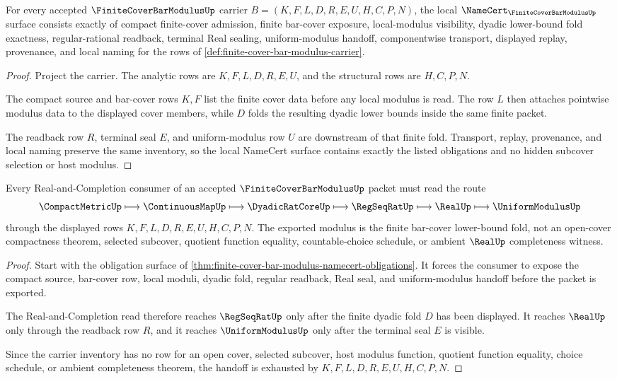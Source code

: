 \begin{theorem}
\label{thm:finite-cover-bar-modulus-namecert-obligations}
For every accepted $\FiniteCoverBarModulusUp$ carrier $B=(K,F,L,D,R,E,U,H,C,P,N)$, the local $\NameCert_{\FiniteCoverBarModulusUp}$ surface consists exactly of compact finite-cover admission, finite bar-cover exposure, local-modulus visibility, dyadic lower-bound fold exactness, regular-rational readback, terminal Real sealing, uniform-modulus handoff, componentwise transport, displayed replay, provenance, and local naming for the rows of \autoref{def:finite-cover-bar-modulus-carrier}.
\end{theorem}
\begin{proof}
Project the carrier. The analytic rows are $K,F,L,D,R,E,U$, and the structural rows are $H,C,P,N$.

The compact source and bar-cover rows $K,F$ list the finite cover data before any local modulus is read. The row $L$ then attaches pointwise modulus data to the displayed cover members, while $D$ folds the resulting dyadic lower bounds inside the same finite packet.

The readback row $R$, terminal seal $E$, and uniform-modulus row $U$ are downstream of that finite fold. Transport, replay, provenance, and local naming preserve the same inventory, so the local NameCert surface contains exactly the listed obligations and no hidden subcover selection or host modulus.
\end{proof}

\begin{theorem}
\label{thm:finite-cover-bar-modulus-real-completion-handoff}
Every Real-and-Completion consumer of an accepted $\FiniteCoverBarModulusUp$ packet must read the route
$$
\CompactMetricUp \longmapsto \ContinuousMapUp \longmapsto \DyadicRatCoreUp \longmapsto \RegSeqRatUp \longmapsto \RealUp \longmapsto \UniformModulusUp
$$
through the displayed rows $K,F,L,D,R,E,U,H,C,P,N$. The exported modulus is the finite bar-cover lower-bound fold, not an open-cover compactness theorem, selected subcover, quotient function equality, countable-choice schedule, or ambient $\RealUp$ completeness witness.
\end{theorem}
\begin{proof}
Start with the obligation surface of \autoref{thm:finite-cover-bar-modulus-namecert-obligations}. It forces the consumer to expose the compact source, bar-cover row, local moduli, dyadic fold, regular readback, Real seal, and uniform-modulus handoff before the packet is exported.

The Real-and-Completion read therefore reaches $\RegSeqRatUp$ only after the finite dyadic fold $D$ has been displayed. It reaches $\RealUp$ only through the readback row $R$, and it reaches $\UniformModulusUp$ only after the terminal seal $E$ is visible.

Since the carrier inventory has no row for an open cover, selected subcover, host modulus function, quotient function equality, choice schedule, or ambient completeness theorem, the handoff is exhausted by $K,F,L,D,R,E,U,H,C,P,N$.
\end{proof}

